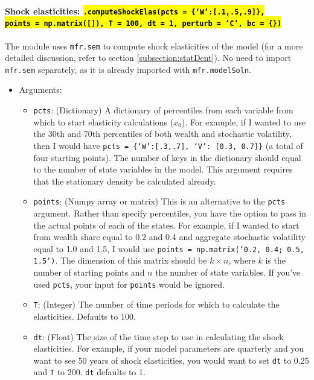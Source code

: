 \documentclass[12pt]{article}
\newcommand{\modelSolnProg}{mfr.modelSoln\xspace}
\newcommand{\semProg}{mfr.sem\xspace}
\newcommand{\wealthProg}{W}
\newcommand{\stochasticVolProg}{V}
\DeclareRobustCommand{\hlCODE}[1]{{\sethlcolor{backcolour}\hl{#1}}}
\begin{document}
\paragraph{Shock elasticities: \hlCODE{\texttt{.computeShockElas(pcts = \{`\wealthProg':[.1,.5,.9]\}, \\points = np.matrix([]), T = 100, dt = 1, perturb = `C', bc = \{\})}}} The module uses  \texttt{\semProg} to compute shock elasticities of the model (for a more detailed discussion, refer to section \ref{subsection:statDent}). No need to import \texttt{\semProg} separately, as it is already imported with  \texttt{\modelSolnProg}.

\begin{itemize}
\item Arguments:

        \begin{itemize}
            \item \texttt{pcts}: (Dictionary) A dictionary of percentiles from each variable
            from which to start elasticity calculations ($x_0$). For example, if I
            wanted to use the 30th and 70th percentiles of both wealth and
            stochastic volatility, then I would have
            \texttt{pcts = \{`\wealthProg':[.3,.7], `\stochasticVolProg': [0.3, 0.7]\}} (a total of four starting points). The number of keys in the dictionary should equal to the number of state variables in the model. This argument
            requires that the stationary density be calculated already.

            \item \texttt{points}: (Numpy array or matrix) This is an alternative to the \texttt{pcts}
            argument. Rather than specify percentiles,
            you have the option to pass in the actual points of each of the states.
            For example, if I wanted to start from wealth share equal to 0.2 and 0.4
            and aggregate stochastic volatility equal to 1.0 and 1.5, I would use
            \texttt{points = np.matrix(`0.2, 0.4; 0.5, 1.5')}. The dimension of this matrix should be $k \times n$, where $k$ is the number of starting points and $n$ the number of state variables.  If you've used \texttt{pcts}, your input for \texttt{points} would be ignored.

            \item \texttt{T}: (Integer) The number of time periods for which to calculate
            the elasticities. Defaults to 100.

            \item \texttt{dt}: (Float) The size of the time step to use in calculating
            the shock elasticities. For example, if your model parameters are
            quarterly and you want to see 50 years of shock elasticities, you
            would want to set \texttt{dt} to 0.25 and \texttt{T} to 200.
            \texttt{dt} defaults to 1.


\end{itemize}
\end{itemize}
\end{document}
